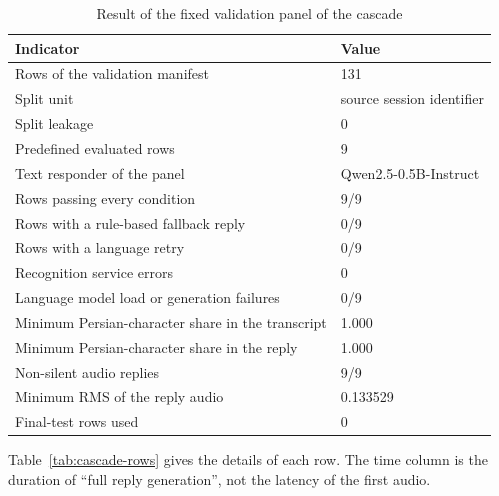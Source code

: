 \begin{table}[ht]
\centering
\caption{Result of the fixed validation panel of the cascade}
\label{tab:cascade-panel}
\small
\begin{tabular}{L{7.6cm}R{3.4cm}}
\toprule
\textbf{Indicator} & \textbf{Value} \\
\midrule
Rows of the validation manifest & 131 \\
Split unit & source session identifier \\
Split leakage & 0 \\
Predefined evaluated rows & 9 \\
Text responder of the panel & Qwen2.5-0.5B-Instruct \\
\midrule
Rows passing every condition & 9/9 \\
Rows with a rule-based fallback reply & 0/9 \\
Rows with a language retry & 0/9 \\
Recognition service errors & 0 \\
Language model load or generation failures & 0/9 \\
Minimum Persian-character share in the transcript & 1.000 \\
Minimum Persian-character share in the reply & 1.000 \\
Non-silent audio replies & 9/9 \\
Minimum RMS of the reply audio & 0.133529 \\
Final-test rows used & 0 \\
\bottomrule
\end{tabular}
\end{table}

Table~\ref{tab:cascade-rows} gives the details of each row. The time column is the
duration of ``full reply generation'', not the latency of the first audio.

